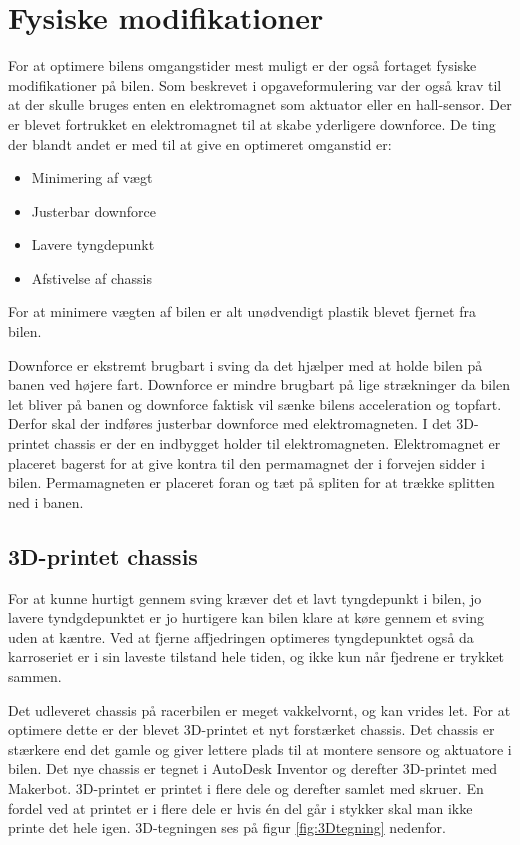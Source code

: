 \newpage
\section{Fysiske modifikationer}
For at optimere bilens omgangstider mest muligt er der også fortaget fysiske modifikationer på bilen. Som beskrevet i opgaveformulering var der også krav til at der skulle bruges enten en elektromagnet som aktuator eller en hall-sensor. Der er blevet fortrukket en elektromagnet til at skabe yderligere downforce. De ting der blandt andet er med til at give en optimeret omganstid er:
\begin{itemize}
\item Minimering af vægt
\item Justerbar downforce
\item Lavere tyngdepunkt
\item Afstivelse af chassis
\end{itemize}
For at minimere vægten af bilen er alt unødvendigt plastik blevet fjernet fra bilen.

Downforce er ekstremt brugbart i sving da det hjælper med at holde bilen på banen ved højere fart. Downforce er mindre brugbart på lige strækninger da bilen let bliver på banen og downforce faktisk vil sænke bilens acceleration og topfart. Derfor skal der indføres justerbar downforce med elektromagneten. I det 3D-printet chassis er der en indbygget holder til elektromagneten. Elektromagnet er placeret bagerst for at give kontra til den permamagnet der i forvejen sidder i bilen. Permamagneten er placeret foran og tæt på spliten for at trække splitten ned i banen.

\subsection{3D-printet chassis}

For at kunne hurtigt gennem sving kræver det et lavt tyngdepunkt i bilen, jo lavere tyndgdepunktet er jo hurtigere kan bilen klare at køre gennem et sving uden at kæntre. Ved at fjerne affjedringen optimeres tyngdepunktet også da karroseriet er i sin laveste tilstand hele tiden, og ikke kun når fjedrene er trykket sammen.

Det udleveret chassis på racerbilen er meget vakkelvornt, og kan vrides let. For at optimere dette er der blevet 3D-printet et nyt forstærket chassis. Det chassis er stærkere end det gamle og giver lettere plads til at montere sensore og aktuatore i bilen. Det nye chassis er tegnet i AutoDesk Inventor og derefter 3D-printet med Makerbot. 3D-printet er printet i flere dele og derefter samlet med skruer. En fordel ved at printet er i flere dele er hvis én del går i stykker skal man ikke printe det hele igen. 3D-tegningen ses på figur \ref{fig:3Dtegning} nedenfor.

